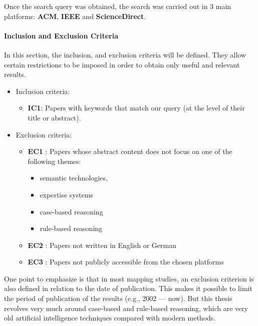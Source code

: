             Once the search query was obtained, the search was carried out in 3 main platforms: \textbf{ACM}, \textbf{IEEE} and \textbf{ScienceDirect}. 


            \paragraph{Inclusion and Exclusion Criteria}
            In this section, the inclusion, and exclusion criteria will be defined. They allow certain restrictions to be imposed in order to obtain only useful and relevant results.

            \begin{itemize}
                \item Inclusion criteria:
                    \begin{itemize}
                        \item \textbf{IC1}: Papers with keywords that match our query (at the level of their title or abstract).
                    \end{itemize}

                \item Exclusion criteria:
                    \begin{itemize}
                        \item \textbf{EC1\label{EC1}} : Papers whose abstract content does not focus on one of the following themes:
                            \begin{itemize}
                                \item semantic technologies,
                                \item expertise systems
                                \item case-based reasoning
                                \item rule-based reasoning
                            \end{itemize}

                        \item \textbf{EC2\label{EC2}} : Papers not written in English or German

                        \item \textbf{EC3\label{EC3}} : Papers not publicly accessible from the chosen platforms
                    \end{itemize}
            \end{itemize}

            One point to emphasize is that in most mapping studies, an exclusion criterion is also defined in relation to the date of publication. This makes it possible to limit the period of publication of the results (e.g., 2002 — now). But this thesis revolves very much around case-based and rule-based reasoning, which are very old artificial intelligence techniques compared with modern methods.

